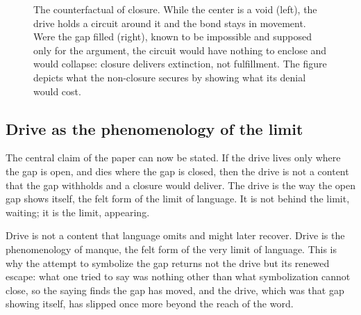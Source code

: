 \begin{figure}[t!]
\centering
{}
\caption{The counterfactual of closure. While the center is a void (left), the drive holds a circuit around it and the bond stays in movement. Were the gap filled (right), known to be impossible and supposed only for the argument, the circuit would have nothing to enclose and would collapse: closure delivers extinction, not fulfillment. The figure depicts what the non-closure secures by showing what its denial would cost.}
\label{p26:fig:closure}
\end{figure}

\subsection*{Drive as the phenomenology of the limit}

The central claim of the paper can now be stated. If the drive lives only where the gap is open, and dies where the gap is closed, then the drive is not a content that the gap withholds and a closure would deliver. The drive is the way the open gap shows itself, the felt form of the limit of language. It is not behind the limit, waiting; it is the limit, appearing.

\begin{claim}
Drive is not a content that language omits and might later recover. Drive is the phenomenology of manque, the felt form of the very limit of language. This is why the attempt to symbolize the gap returns not the drive but its renewed escape: what one tried to say was nothing other than what symbolization cannot close, so the saying finds the gap has moved, and the drive, which was that gap showing itself, has slipped once more beyond the reach of the word.
\end{claim}
